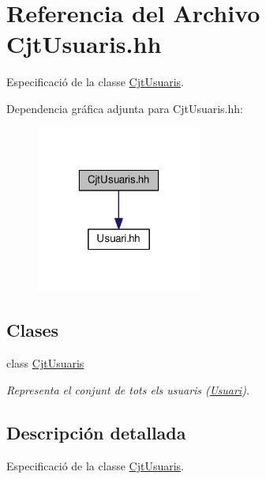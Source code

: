 \hypertarget{_cjt_usuaris_8hh}{}\section{Referencia del Archivo Cjt\+Usuaris.\+hh}
\label{_cjt_usuaris_8hh}


Especificació de la classe \mbox{\hyperlink{class_cjt_usuaris}{Cjt\+Usuaris}}.  


Dependencia gráfica adjunta para Cjt\+Usuaris.\+hh\+:\nopagebreak
\begin{figure}[H]
\begin{center}
\leavevmode
\includegraphics[width=154pt]{_cjt_usuaris_8hh__incl}
\end{center}
\end{figure}
\subsection*{Clases}
\begin{DoxyCompactItemize}
\item 
class \mbox{\hyperlink{class_cjt_usuaris}{Cjt\+Usuaris}}
\begin{DoxyCompactList}\small\item\em Representa el conjunt de tots els usuaris (\mbox{\hyperlink{class_usuari}{Usuari}}).\end{DoxyCompactList}\end{DoxyCompactItemize}


\subsection{Descripción detallada}
Especificació de la classe \mbox{\hyperlink{class_cjt_usuaris}{Cjt\+Usuaris}}. 

